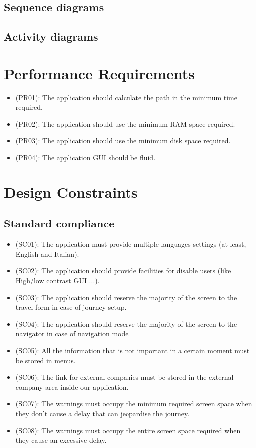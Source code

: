 \documentclass[a4paper,leqno]{book}
\begin{document}
\subsection{Sequence diagrams}

\subsection{Activity diagrams}

\section{Performance Requirements}
\begin{itemize}
\item (PR01): The application should calculate the path in the minimum time required.
\item (PR02): The application should use the minimum RAM space required.
\item (PR03): The application should use the minimum disk space required.
\item (PR04): The application GUI should be fluid.
\end{itemize}

\section{Design Constraints}
\subsection{Standard compliance}
\begin{itemize}
\item (SC01): The application must provide multiple languages settings (at least, English and Italian).
\item (SC02): The application should provide facilities for disable users (like High/low contrast GUI ...).
\item (SC03): The application should reserve the majority of the screen to the travel form in case of journey setup.
\item (SC04): The application should reserve the majority of the screen to the navigator in case of navigation mode.
\item (SC05): All the information that is not important in a certain moment must be stored in menus.
\item (SC06): The link for external companies must be stored in the external company area inside our application.
\item (SC07): The warnings must occupy the minimum required screen space  when they don't cause a delay that can jeopardise the journey.
\item (SC08): The warnings must occupy the entire screen space required when they cause an excessive delay.
\end{itemize}
\end{document}
